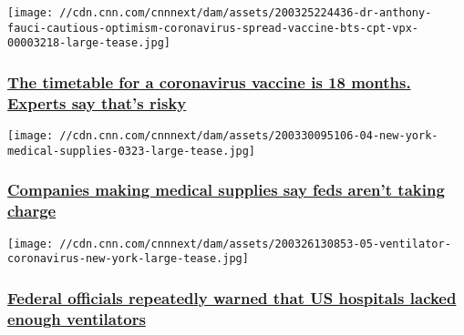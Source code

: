 \href{/2020/03/31/us/coronavirus-vaccine-timetable-concerns-experts-invs/index.html}{}

\texttt{[image: //cdn.cnn.com/cnnnext/dam/assets/200325224436-dr-anthony-fauci-cautious-optimism-coronavirus-spread-vaccine-bts-cpt-vpx-00003218-large-tease.jpg]}

\hypertarget{the-timetable-for-a-coronavirus-vaccine-is-18-months-experts-say-thats-risky}{%
\subsubsection{\texorpdfstring{\href{/2020/03/31/us/coronavirus-vaccine-timetable-concerns-experts-invs/index.html}{The
timetable for a coronavirus vaccine is 18 months. Experts say that's
risky}}{The timetable for a coronavirus vaccine is 18 months. Experts say that's risky}}\label{the-timetable-for-a-coronavirus-vaccine-is-18-months-experts-say-thats-risky}}

\href{/2020/04/01/politics/coronavirus-manufacturers-ventilators/index.html}{}

\texttt{[image: //cdn.cnn.com/cnnnext/dam/assets/200330095106-04-new-york-medical-supplies-0323-large-tease.jpg]}

\hypertarget{companies-making-medical-supplies-say-feds-arent-taking-charge}{%
\subsubsection{\texorpdfstring{\href{/2020/04/01/politics/coronavirus-manufacturers-ventilators/index.html}{Companies
making medical supplies say feds aren't taking
charge}}{Companies making medical supplies say feds aren't taking charge}}\label{companies-making-medical-supplies-say-feds-arent-taking-charge}}

\href{/2020/03/27/cnn10/ventilators-supply-government-warnings-coronavirus-invs/index.html}{}

\texttt{[image: //cdn.cnn.com/cnnnext/dam/assets/200326130853-05-ventilator-coronavirus-new-york-large-tease.jpg]}

\hypertarget{federal-officials-repeatedly-warned-that-us-hospitals-lacked-enough-ventilators}{%
\subsubsection{\texorpdfstring{\href{/2020/03/27/cnn10/ventilators-supply-government-warnings-coronavirus-invs/index.html}{Federal
officials repeatedly warned that US hospitals lacked enough
ventilators}}{Federal officials repeatedly warned that US hospitals lacked enough ventilators}}\label{federal-officials-repeatedly-warned-that-us-hospitals-lacked-enough-ventilators}}

